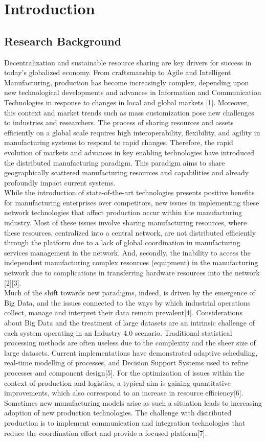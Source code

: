 \chapter{Introduction}

\section{Research Background}
Decentralization and sustainable resource sharing are key drivers for success in today’s globalized economy. From craftsmanship to Agile and Intelligent Manufacturing, production has become increasingly complex, depending upon new technological developments and advances in Information and Communication Technologies in response to changes in local and global markets [1]. Moreover, this context and market trends such as mass customization pose new challenges to industries and researchers. The process of sharing resources and assets efficiently on a global scale requires high interoperability, flexibility, and agility in manufacturing systems to respond to rapid changes. Therefore, the rapid evolution of markets and advances in key enabling technologies have introduced the distributed manufacturing paradigm. This paradigm aims to share geographically scattered manufacturing resources and capabilities and already profoundly impact current systems.\\
While the introduction of state-of-the-art technologies presents positive benefits for manufacturing enterprises over competitors, new issues in implementing these network technologies that affect production occur within the manufacturing industry. Most of these issues involve sharing manufacturing resources, where these resources, centralized into a central network, are not distributed efficiently through the platform due to a lack of global coordination in manufacturing services management in the network. And, secondly, the inability to access the independent manufacturing complex resources (equipment) in the manufacturing network due to complications in transferring hardware resources into the network [2][3].\\
Much of the shift towards new paradigms, indeed, is driven by the emergence of Big Data, and the issues connected to the ways by which industrial operations collect, manage and interpret their data remain prevalent[4]. Considerations about Big Data and the treatment of large datasets are an intrinsic challenge of each system operating in an Industry 4.0 scenario. Traditional statistical processing methods are often useless due to the complexity and the sheer size of large datasets. Current implementations have demonstrated adaptive scheduling, real-time modelling of processes, and Decision Support Systems used to refine processes and component design[5]. For the optimization of issues within the context of production and logistics, a typical aim is gaining quantitative improvements, which also correspond to an increase in resource efficiency[6]. Sometimes new manufacturing models arise as such a situation leads to increasing adoption of new production technologies. The challenge with distributed production is to implement communication and integration technologies that reduce the coordination effort and provide a focused platform[7].\\
